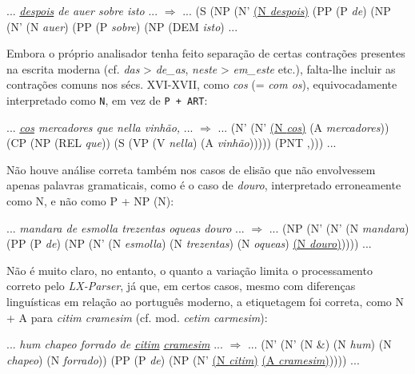 \documentclass[portuguese]{textolivre}
\begin{document}
\begin{description}[topsep=10pt, parsep=2pt, itemindent=!]
\item[(14)\label{14}] ... \textit{\uline{despois} de auer sobre isto} ... $\Rightarrow$ ... (S (NP (N' \uline{(N \textit{despois})} (PP (P \textit{de}) (NP (N' (N \textit{auer}) (PP (P \textit{sobre}) (NP (DEM \textit{isto}) ...
\end{description}

Embora o próprio analisador tenha feito separação de certas contrações presentes na escrita moderna (cf. \textit{das} > \textit{de\_as}, \textit{neste} > \textit{em\_este} etc.), falta-lhe incluir as contrações comuns nos sécs. XVI-XVII, como \textit{cos} (= \textit{com os}), equivocadamente interpretado como \texttt{N}, em vez de \texttt{P + ART}:

\begin{description}[topsep=10pt, parsep=2pt, itemindent=!]
\item[(15)\label{15}] ... \textit{\uline{cos} mercadores que nella vinhão,} ... $\Rightarrow$ ... (N' (N' \uline{(N \textit{cos})} (A \textit{mercadores})) (CP (NP (REL \textit{que})) (S (VP (V \textit{nella}) (A \textit{vinhão}))))) (PNT ,))) ...
\end{description}

Não houve análise correta também nos casos de elisão que não envolvessem apenas palavras gramaticais, como é o caso de \textit{douro}, interpretado erroneamente como N, e não como P + NP (N):

\begin{description}[topsep=10pt, parsep=2pt, itemindent=!]
\item[(16)\label{16}] ... \textit{mandara de esmolla trezentas oqueas douro} ...  $\Rightarrow$ ... (NP (N' (N' (N \textit{mandara}) (PP (P \textit{de}) (NP (N' (N \textit{esmolla}) (N \textit{trezentas}) (N \textit{oqueas}) \uline{(N \textit{douro})})))) ...
\end{description}

Não é muito claro, no entanto, o quanto a variação limita o processamento correto pelo \textit{LX-Parser}, já que, em certos casos, mesmo com diferenças linguísticas em relação ao português moderno, a etiquetagem foi correta, como N + A para \textit{citim cramesim} (cf. mod. \textit{cetim carmesim}):

\begin{description}[topsep=10pt, parsep=2pt, itemindent=!, itemindent=!]
\item[(17)\label{17}] ... \textit{hum chapeo forrado de \uline{citim} \uline{cramesim}} ... $\Rightarrow$ ... (N' (N' (N \&) (N \textit{hum}) (N \textit{chapeo}) (N \textit{forrado})) (PP (P \textit{de}) (NP (N' \uline{(N \textit{citim})} \uline{(A \textit{cramesim})})))) ...
\end{description}
\end{document}
